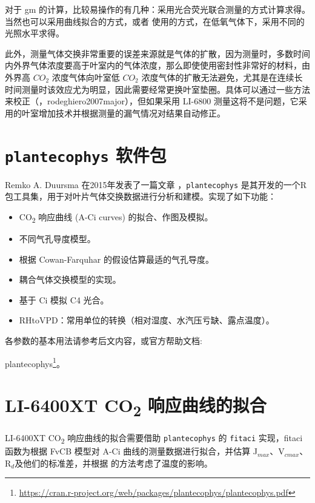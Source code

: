 \documentclass[]{krantz}
\providecommand{\tightlist}{%
  \setlength{\itemsep}{0pt}\setlength{\parskip}{0pt}}
\renewcommand{\href}[2]{#2\footnote{\url{#1}}}
\theoremstyle{definition}
\theoremstyle{definition}
\theoremstyle{definition}
\theoremstyle{remark}
\begin{document}
对于 gm
的计算，比较易操作的有几种：采用光合荧光联合测量的方式计算求得。当然也可以采用曲线拟合的方式，或者
\citet{yin2009using} 使用的方式，在低氧气体下，采用不同的光照水平求得。

此外，测量气体交换非常重要的误差来源就是气体的扩散，因为测量时，多数时间内外界气体浓度要高于叶室内的气体浓度，那么即使使用密封性非常好的材料，由外界高
\(CO_2\) 浓度气体向叶室低 \(CO_2\)
浓度气体的扩散无法避免，尤其是在连续长时间测量时该效应尤为明显，因此需要经常更换叶室垫圈。具体可以通过一些方法来校正（\citet{Flexas2007leak}，rodeghiero2007major），但如果采用
LI-6800
测量这将不是问题，它采用的叶室增加技术并根据测量的漏气情况对结果自动修正。

\section{\texorpdfstring{\texttt{plantecophys}
软件包}{plantecophys 软件包}}\label{plantecophys}

Remko A. Duursma 在2015年发表了一篇文章
\citet{Duursma2015Plantecophys}，\texttt{plantecophys}
是其开发的一个R包工具集，用于对叶片气体交换数据进行分析和建模。实现了如下功能：

\begin{itemize}
\tightlist
\item
  CO\textsubscript{2} 响应曲线 (A-Ci curves) 的拟合、作图及模拟。
\item
  不同气孔导度模型。
\item
  根据 Cowan-Farquhar 的假设估算最适的气孔导度。
\item
  耦合气体交换模型的实现。
\item
  基于 Ci 模拟 C4 光合。
\item
  RHtoVPD：常用单位的转换（相对湿度、水汽压亏缺、露点温度）。
\end{itemize}

各参数的基本用法请参考后文内容，或官方帮助文档:

\href{https://cran.r-project.org/web/packages/plantecophys/plantecophys.pdf}{plantecophys}。

\section{\texorpdfstring{LI-6400XT CO\textsubscript{2}
响应曲线的拟合}{LI-6400XT CO2 响应曲线的拟合}}\label{fit6400}

LI-6400XT CO\textsubscript{2} 响应曲线的拟合需要借助
\texttt{plantecophys} 的 \texttt{fitaci} 实现，fitaci 函数为根据 FvCB
模型对 A-Ci 曲线的测量数据进行拟合，并估算
J\(_{max}\)、V\(_{cmax}\)、R\(_{d}\)及他们的标准差，并根据
\citet{Medlyn2002Temperature} 的方法考虑了温度的影响。
\end{document}
